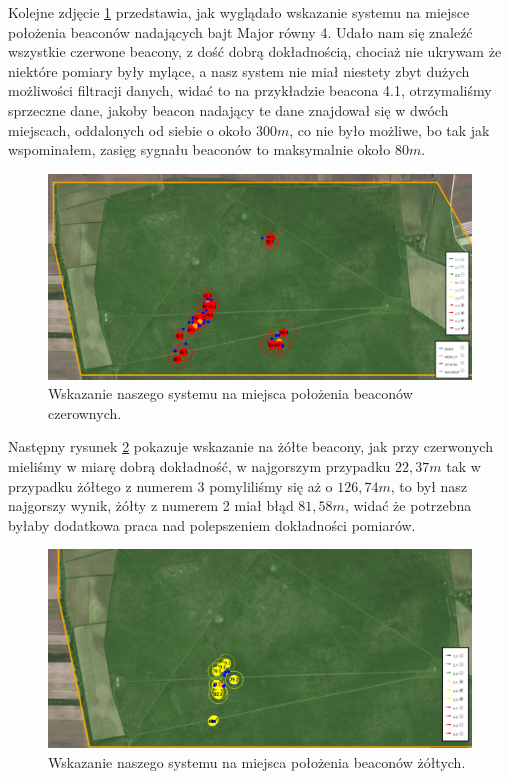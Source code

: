Kolejne zdjęcie \ref{fig:wskazanieczerwone} przedstawia, jak wyglądało wskazanie systemu na miejsce położenia beaconów nadających bajt Major równy 4. Udało nam się znaleźć wszystkie czerwone beacony, z dość dobrą dokładnością, chociaż nie ukrywam że niektóre pomiary były mylące, a nasz system nie miał niestety zbyt dużych możliwości filtracji danych, widać to na przykładzie beacona 4.1, otrzymaliśmy sprzeczne dane, jakoby beacon nadający te dane znajdował się w dwóch miejscach, oddalonych od siebie o około $300 m$, co nie było możliwe, bo tak jak wspominałem, zasięg sygnału beaconów to maksymalnie około $80 m$.

\begin{figure}[!th]
    \centering
    \includegraphics[width=15cm]{zalaczniki/obrazy/wskazanie_czerwone.png}
    \caption{Wskazanie naszego systemu na miejsca położenia beaconów czerownych.}
    \label{fig:wskazanieczerwone}
\end{figure}

Następny rysunek \ref{fig:wskazaniezolte} pokazuje wskazanie na żółte beacony, jak przy czerwonych mieliśmy w miarę dobrą dokładność, w najgorszym przypadku $22,37 m$ tak w przypadku żółtego z numerem 3 pomyliliśmy się aż o $126,74 m$, to był nasz najgorszy wynik, żółty z numerem 2 miał błąd $81,58 m$, widać że potrzebna byłaby dodatkowa praca nad polepszeniem dokładności pomiarów.

\begin{figure}[!th]
    \centering
    \includegraphics[width=15cm]{zalaczniki/obrazy/wskazanie_zolte.png}
    \caption{Wskazanie naszego systemu na miejsca położenia beaconów żółtych.}
    \label{fig:wskazaniezolte}
\end{figure}

